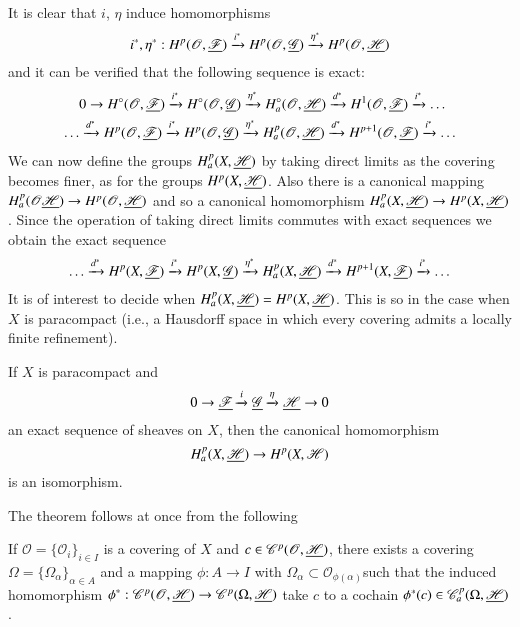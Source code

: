 It is clear that $i$, $\eta$ induce homomorphisms
$$
i^\ast , \eta^\ast : H^p (\mathscr{O}, \underline{\mathscr{F}})
\xrightarrow{i^\ast} H^p (\mathscr{O}, \underline{\mathscr{G}})
\xrightarrow{\eta^\ast} H^p (\mathscr{O}, \underline{\mathscr{H}})
$$
and it can be verified that the following sequence is exact:
\begin{align*}
& 0 \to H^\circ (\mathscr{O}, \underline{\mathscr{F}}) \xrightarrow{i^\ast}
  H^\circ (\mathscr{O}, \underline{\mathscr{G}}) \xrightarrow{\eta^\ast}
  H^\circ_a(\mathscr{O}, \underline{\mathscr{H}}) \xrightarrow{d^\ast} H^1
  (\mathscr{O}, \underline{\mathscr{F}}) \xrightarrow{i^\ast} \ldots \\
\ldots & \xrightarrow{d^\ast} H^p(\mathscr{O}, \underline{\mathscr{F}})
\xrightarrow{i^\ast} H^p(\mathscr{O}, \underline{\mathscr{G}})
\xrightarrow{\eta^\ast} H^p_a (\mathscr{O}, \underline{\mathscr{H}})
\xrightarrow{d^\ast}  H^{p+1} (\mathscr{O}, \underline{\mathscr{F}})
\xrightarrow{i^\ast}  \ldots 
\end{align*}
We can now define the groups $H^p_a (X, \underline{\mathscr{H}})$ by taking
direct limits as the covering becomes finer, as for the groups $H^p(X,
\underline{\mathscr{H}})$. Also there is a canonical mapping $H^p_a
(\mathscr{O} \underline{\mathscr{H}}) \to H^p (\mathscr{O}, \underline{\mathscr{H}})$
and so a canonical homomorphism $H^p_a (X, \underline{\mathscr{H}}) \to H^p
(X, \underline{\mathscr{H}})$. Since the operation of taking direct limits
commutes with exact sequences we obtain the exact sequence
$$
\ldots \xrightarrow{d^\ast} H^p (X, \underline{\mathscr{F}})
\xrightarrow{i^\ast} H^p(X,\underline{\mathscr{G}}) \xrightarrow{\eta^\ast}
H^p_a (X, \underline{\mathscr{H}}) \xrightarrow{d^\ast} H^{p+1} (X,
\underline{\mathscr{F}}) \xrightarrow{i^\ast} \ldots 
$$
It is of interest to decide when $H^p_a (X, \underline{\mathscr{H}}) = H^p
(X,\underline{\mathscr{H}})$. This is so in the case when $X$ is paracompact
(i.e., a Hausdorff space in which every covering admits a locally
finite refinement).

\begin{theorem*}
If $X$ is paracompact and 
$$
0 \to \underline{\mathscr{F}} \xrightarrow{i} \underline{\mathscr{G}}
\xrightarrow{\eta} \underline{\mathscr{H}} \to 0
$$
an exact sequence of sheaves on $X$, then the canonical homomorphism
$$
H^p_a(X, \underline{\mathscr{H}}) \to H^p (X, \mathscr{H})
$$
is an isomorphism.
\end{theorem*}

The theorem follows at once from the following

\begin{lemma*}
If $\mathscr{O} = \{\mathscr{O}_i\}_{i\in I}$ is a covering of $X$ and
$c \in \mathscr{C}^p (\mathscr{O}, \underline{\mathscr{H}})$, there exists a
covering $\Omega = \{\Omega_\alpha\}_{\alpha \in A}$ and a mapping
$\phi: A \to I$ with $\Omega_\alpha \subset
\mathscr{O}_{\phi(\alpha)}$\pageoriginale such that the induced
homomorphism $\phi^\ast: \mathscr{C}^p (\mathscr{O}, \underline{\mathscr{H}})
\to \mathscr{C}^p (\Omega, \underline{\mathscr{H}})$ take $c$ to a cochain
$\phi^\ast (c) \in \mathscr{C}^p_a (\Omega, \underline{\mathscr{H}})$. 
\end{lemma*}

